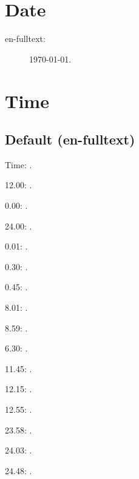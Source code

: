 \documentclass{article}
\begin{document}
\section{Date}

\begin{description}
\item[en-fulltext:]
\today.

%
\end{description}

\section{Time}
\subsection{Default (en-fulltext)}

Time: \DTMcurrenttime.

12.00: .

0.00: .

24.00: .

0.01: .

0.30: .

0.45: .

8.01: .

8.59: .

6.30: .

11.45: .

12.15: .

12.55: .

23.58: .

24.03: .

24.48: .
\end{document}
